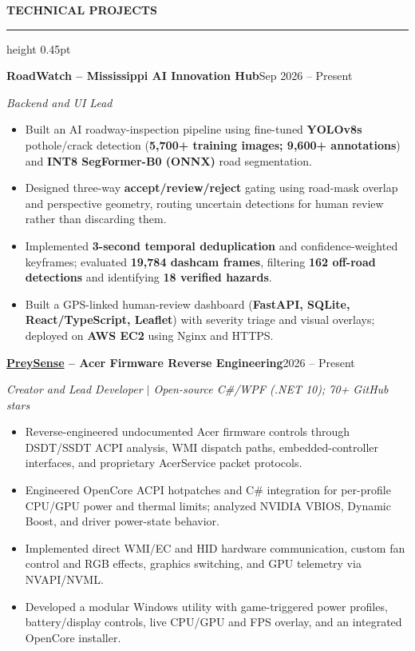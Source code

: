 \documentclass[11pt]{article}
\newcommand{\cvsection}[1]{%
  \Needspace{4\baselineskip}%
  \par\addvspace{8.5pt}%
  \noindent\textbf{\MakeUppercase{#1}}\par\nobreak
  \vspace{2pt}\hrule height 0.45pt\relax\nobreak\vspace{4pt}%
}
\newcommand{\subentry}[2]{\par\noindent\textbf{#1}\hfill #2\par}
\begin{document}
\cvsection{Technical Projects}
\subentry{RoadWatch -- Mississippi AI Innovation Hub}{Sep 2026 -- Present}
\textit{Backend and UI Lead}
\begin{itemize}
    \item Built an AI roadway-inspection pipeline using fine-tuned \textbf{YOLOv8s} pothole/crack detection (\textbf{5,700+ training images; 9,600+ annotations}) and \textbf{INT8 SegFormer-B0 (ONNX)} road segmentation.
    \item Designed three-way \textbf{accept/review/reject} gating using road-mask overlap and perspective geometry, routing uncertain detections for human review rather than discarding them.
    \item Implemented \textbf{3-second temporal deduplication} and confidence-weighted keyframes; evaluated \textbf{19,784 dashcam frames}, filtering \textbf{162 off-road detections} and identifying \textbf{18 verified hazards}.
    \item Built a GPS-linked human-review dashboard (\textbf{FastAPI, SQLite, React/TypeScript, Leaflet}) with severity triage and visual overlays; deployed on \textbf{AWS EC2} using Nginx and HTTPS.
\end{itemize}
\vspace{2pt}
\subentry{\href{https://github.com/hammadzaigham/PreySense}{PreySense} -- Acer Firmware Reverse Engineering}{2026 -- Present}
\textit{Creator and Lead Developer $\vert$ Open-source C\#/WPF (.NET 10); 70+ GitHub stars}
\begin{itemize}
  \item Reverse-engineered undocumented Acer firmware controls through DSDT/SSDT
  ACPI analysis, WMI dispatch paths, embedded-controller interfaces, and proprietary
  AcerService packet protocols.
  \item Engineered OpenCore ACPI hotpatches and C\# integration for per-profile CPU/GPU
  power and thermal limits; analyzed NVIDIA VBIOS, Dynamic Boost, and driver
  power-state behavior.
  \item Implemented direct WMI/EC and HID hardware communication, custom fan
  control and RGB effects, graphics switching, and GPU telemetry via NVAPI/NVML.
  \item Developed a modular Windows utility with game-triggered power profiles,
  battery/display controls, live CPU/GPU and FPS overlay, and an integrated
  OpenCore installer.
\end{itemize}
\end{document}
